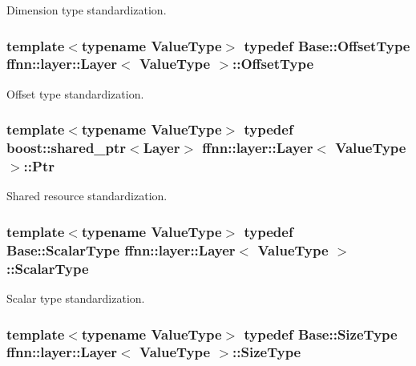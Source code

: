 Dimension type standardization. 

\hypertarget{classffnn_1_1layer_1_1_layer_a0e35ffd6e0657856f3a75323b2db9fcb}{
\subsubsection[{Offset\-Type}]{\setlength{\rightskip}{0pt plus 5cm}template$<$typename Value\-Type$>$ typedef {\bf Base\-::\-Offset\-Type} {\bf ffnn\-::layer\-::\-Layer}$<$ Value\-Type $>$\-::{\bf Offset\-Type}}}\label{classffnn_1_1layer_1_1_layer_a0e35ffd6e0657856f3a75323b2db9fcb}


Offset type standardization. 

\hypertarget{classffnn_1_1layer_1_1_layer_ab909b3fbacb9688059f9f22302f266f4}{
\subsubsection[{Ptr}]{\setlength{\rightskip}{0pt plus 5cm}template$<$typename Value\-Type$>$ typedef boost\-::shared\-\_\-ptr$<${\bf Layer}$>$ {\bf ffnn\-::layer\-::\-Layer}$<$ Value\-Type $>$\-::{\bf Ptr}}}\label{classffnn_1_1layer_1_1_layer_ab909b3fbacb9688059f9f22302f266f4}


Shared resource standardization. 

\hypertarget{classffnn_1_1layer_1_1_layer_ab63020e6e3d9270a748cb22c2432c93a}{
\subsubsection[{Scalar\-Type}]{\setlength{\rightskip}{0pt plus 5cm}template$<$typename Value\-Type$>$ typedef {\bf Base\-::\-Scalar\-Type} {\bf ffnn\-::layer\-::\-Layer}$<$ Value\-Type $>$\-::{\bf Scalar\-Type}}}\label{classffnn_1_1layer_1_1_layer_ab63020e6e3d9270a748cb22c2432c93a}


Scalar type standardization. 

\hypertarget{classffnn_1_1layer_1_1_layer_aeccac281d4220fab9cebf78b004c09d1}{
\subsubsection[{Size\-Type}]{\setlength{\rightskip}{0pt plus 5cm}template$<$typename Value\-Type$>$ typedef {\bf Base\-::\-Size\-Type} {\bf ffnn\-::layer\-::\-Layer}$<$ Value\-Type $>$\-::{\bf Size\-Type}}}\label{classffnn_1_1layer_1_1_layer_aeccac281d4220fab9cebf78b004c09d1}


